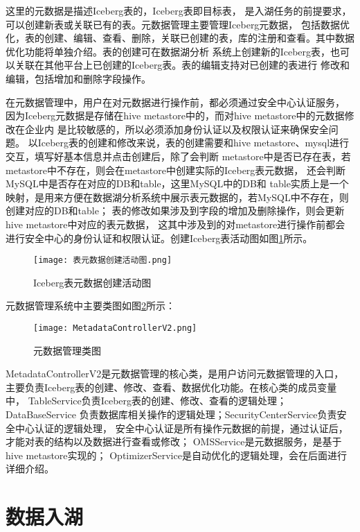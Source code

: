 这里的元数据是描述Iceberg表的，Iceberg表即目标表，
是入湖任务的前提要求，可以创建新表或关联已有的表。元数据管理主要管理Iceberg元数据，
包括数据优化，表的创建、编辑、查看、删除，关联已创建的表，库的注册和查看。其中数据优化功能将单独介绍。表的创建可在数据湖分析
系统上创建新的Iceberg表，也可以关联在其他平台上已创建的Iceberg表。表的编辑支持对已创建的表进行
修改和编辑，包括增加和删除字段操作。

在元数据管理中，用户在对元数据进行操作前，都必须通过安全中心认证服务，
因为Iceberg元数据是存储在hive metastore中的，而对hive metastore中的元数据修改在企业内
是比较敏感的，所以必须添加身份认证以及权限认证来确保安全问题。
以Iceberg表的创建和修改来说，表的创建需要和hive metastore、mysql进行交互，填写好基本信息并点击创建后，除了会判断
metastore中是否已存在表，若metastore中不存在，则会在metastore中创建实际的Iceberg表元数据，
还会判断MySQL中是否存在对应的DB和table，这里MySQL中的DB和
table实质上是一个映射，是用来方便在数据湖分析系统中展示表元数据的，若MySQL中不存在，则创建对应的DB和table；
表的修改如果涉及到字段的增加及删除操作，则会更新hive metastore中对应的表元数据，
这其中涉及到的对metastore进行操作前都会进行安全中心的身份认证和权限认证。创建Iceberg表活动图如图\ref{fig:表元数据创建活动图}所示。

\begin{figure}[H]
  \centering
  \texttt{[image: 表元数据创建活动图.png]}
  \caption{Iceberg表元数据创建活动图}
  \label{fig:表元数据创建活动图}
\end{figure}

元数据管理系统中主要类图如图\ref{fig:MetadataControllerV2}所示：

\begin{figure}[H]
  \centering
  \texttt{[image: MetadataControllerV2.png]}
  \caption{元数据管理类图}
  \label{fig:MetadataControllerV2}
\end{figure}

MetadataControllerV2是元数据管理的核心类，是用户访问元数据管理的入口，
主要负责Iceberg表的创建、修改、查看、数据优化功能。在核心类的成员变量中，
TableService负责Iceberg表的创建、修改、查看的逻辑处理；DataBaseService
负责数据库相关操作的逻辑处理；SecurityCenterService负责安全中心认证的逻辑处理，
安全中心认证是所有操作元数据的前提，通过认证后，才能对表的结构以及数据进行查看或修改；
OMSService是元数据服务，是基于hive metastore实现的；
OptimizerService是自动优化的逻辑处理，会在后面进行详细介绍。


\section{数据入湖}

